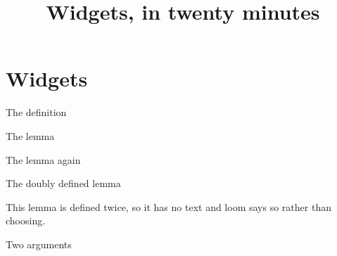 \documentclass{beamer}
\title{Widgets, in twenty minutes}
\theoremstyle{definition}
\begin{document}
\begin{frame}
\titlepage
\end{frame}

\section{Widgets}\label{sy-0400}

\begin{frame}{The definition}

\end{frame}

\begin{frame}{The lemma}

\end{frame}

\begin{frame}{The lemma again}

\end{frame}

\begin{frame}{The doubly defined lemma}
\begin{lemma}\label{sy-999B}
This lemma is defined twice, so it has no text and loom says so rather than choosing.
\end{lemma}
\end{frame}

\begin{frame}{Two arguments}

\end{frame}
\end{document}
